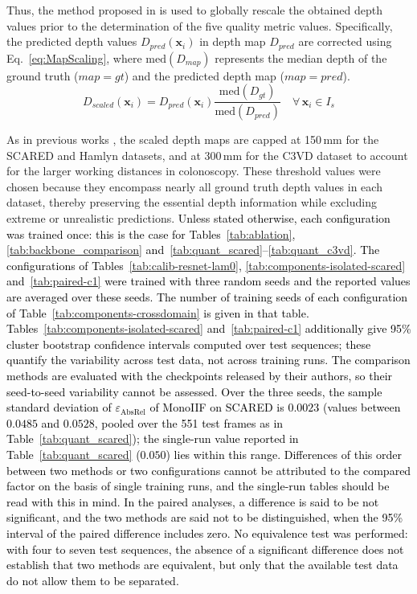 \documentclass[a4paper,fleqn]{cas-dc}
\begin{document}
Thus, the method proposed in \citep{Godard_ICCV_2019} is used to globally rescale the obtained depth values prior to the determination of the five quality metric values. Specifically, the predicted depth values \( D_{pred}(\mathbf{x}_i) \) in depth map \( D_{pred} \) are corrected using Eq.~\eqref{eq:MapScaling}, where \( \textrm{med}(D_{map}) \) represents the median depth of the ground truth (\( map = gt \)) and the predicted depth map (\( map = pred \)).
%
\begin{equation} \label{eq:MapScaling}
    D_{scaled}(\mathbf{x}_i) = D_{pred}(\mathbf{x}_i) \frac{\textrm{med}(D_{gt})} {\textrm{med}(D_{pred})} \quad \forall \, \mathbf{x}_i \in I_s
\end{equation}
%

As in previous works \citep{Godard_ICCV_2019,Ozyoruk_MIA_2021,Shao_MIA_2022}, the scaled depth maps are capped at 150\,mm for the SCARED and Hamlyn datasets, and at 300\,mm for the C3VD dataset to account for the larger working distances in colonoscopy. These threshold values were chosen because they encompass nearly all ground truth depth values in each dataset, thereby preserving the essential depth information while excluding extreme or unrealistic predictions.
\textcolor{black}
{
Unless stated otherwise, each configuration was trained once: this is the case for
Tables~\ref{tab:ablation}, \ref{tab:backbone_comparison} and~\ref{tab:quant_scared}--\ref{tab:quant_c3vd}.
The configurations of Tables~\ref{tab:calib-resnet-lam0}, \ref{tab:components-isolated-scared}
and~\ref{tab:paired-c1} were trained with three random seeds and the reported values are averaged over these seeds. \textcolor{black}{The number of training seeds of each configuration of Table~\ref{tab:components-crossdomain} is given in that table.} Tables~\ref{tab:components-isolated-scared} and~\ref{tab:paired-c1} additionally
give 95\% cluster bootstrap confidence intervals computed over test sequences; these quantify the
variability across test data, not across training runs. The comparison methods are evaluated with
the checkpoints released by their authors, so their seed-to-seed variability cannot be assessed.
Over the three seeds, the sample standard deviation of $\varepsilon_\textrm{AbsRel}$ of MonoIIF on
SCARED is $0.0023$ (values between $0.0485$ and $0.0528$, pooled over the 551 test frames as in
Table~\ref{tab:quant_scared}); the single-run value reported in Table~\ref{tab:quant_scared}
($0.050$) lies within this range. Differences of this order between two methods or two
configurations cannot be attributed to the compared factor on the basis of single training runs,
and the single-run tables should be read with this in mind. \textcolor{black}{In the paired analyses, a difference is said to be not significant, and the two methods are said not to be distinguished, when the 95\% interval of the paired difference includes zero. No equivalence test was performed: with four to seven test sequences, the absence of a significant difference does not establish that two methods are equivalent, but only that the available test data do not allow them to be separated.}}
\end{document}
